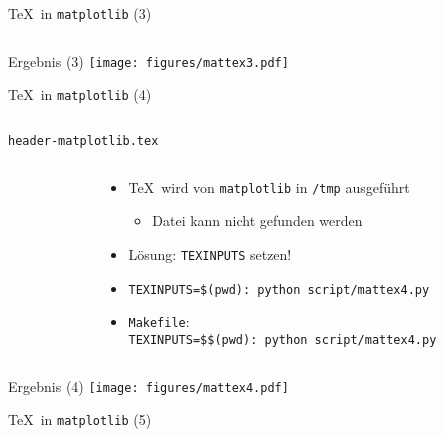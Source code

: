 \begin{frame}[fragile]{\TeX\ in \texttt{matplotlib} (3)}
  \inputminted{python}{script/mattex3.py}
\end{frame}

\AddToShipoutPictureFG*{\ShowFramePicture}
\begin{frame}{Ergebnis (3)}%
  \centering%
  \texttt{[image: figures/mattex3.pdf]}%
\end{frame}

\begin{frame}[fragile]{\TeX\ in \texttt{matplotlib} (4)}
  \inputminted{python}{script/mattex4.py}
\end{frame}

\begin{frame}[fragile]{\texttt{header-matplotlib.tex}}
  \begin{columns}[onlytextwidth]%
    \begin{column}{0.35\textwidth}%
      \small
      \inputminted{latex}{../common/header-matplotlib.tex}
    \end{column}%
    \hfill%
    \begin{column}{0.645\textwidth}%
      \begin{itemize}
        \item \TeX\ wird von \texttt{matplotlib} in \texttt{/tmp} ausgeführt
          \begin{itemize}
            \item Datei kann nicht gefunden werden
          \end{itemize}
        \item Lösung: \texttt{TEXINPUTS} setzen!
        \item \texttt{TEXINPUTS=\$(pwd): python script/mattex4.py}
        \item \texttt{Makefile}:\\
          \texttt{TEXINPUTS=\$\$(pwd): python script/mattex4.py}
      \end{itemize}
    \end{column}%
  \end{columns}%
\end{frame}

\AddToShipoutPictureFG*{\ShowFramePicture}
\begin{frame}{Ergebnis (4)}
  \centering
  \texttt{[image: figures/mattex4.pdf]}
\end{frame}

\begin{frame}[fragile]{\TeX\ in \texttt{matplotlib} (5)}
  \inputminted{python}{script/mattex5.py}
\end{frame}

